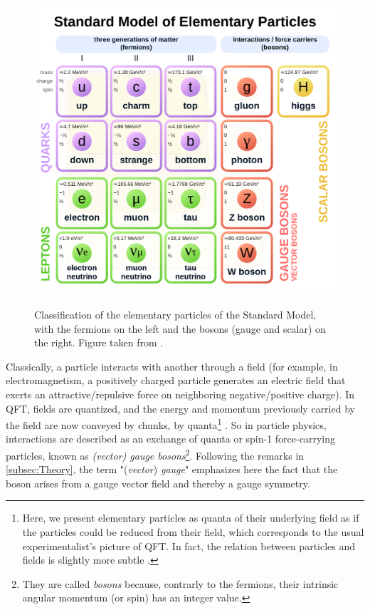 \begin{figure}[h]
	\centering
	\includegraphics[width=\textwidth]{Figs/Chapter2/Standard_Model_of_Elementary_Particles.svg.png}\label{fig:StdModel}
	\caption{Classification of the elementary particles of the Standard Model, with the fermions on the left and the bosons (gauge and scalar) on the right. Figure taken from \cite{missmjStandardModelElementary2019}.}
	\label{fig:StdModel}
\end{figure}

Classically, a particle interacts with another through a field (for example, in electromagnetism, a positively charged particle generates an electric field that exerts an attractive/repulsive force on neighboring negative/positive charge). In QFT, fields are quantized, and the energy and momentum previously carried by the field are now conveyed by chunks, by quanta\footnote{Here, we present elementary particles as quanta  of their underlying field as if the particles could be reduced from their field, which corresponds to the usual experimentalist's picture of QFT. In fact, the relation between particles and fields is slightly more subtle \cite{jaegerElementaryParticlesQuantum2021}.} \cite{serwayModernPhysics2004}. So in particle physics, interactions are described as an exchange of quanta or spin-1 force-carrying particles, known as \textit{(vector) gauge bosons}\footnote{They are called \textit{bosons} because, contrarly to the fermions, their intrinsic angular momentum (or spin) has an integer value.}\cite{braibantParticlesFundamentalInteractions2012}\cite{thomsonModernParticlePhysics2013}. Following the remarks in \Sec\ref{subsec:Theory}, the term "(\textit{vector}) \textit{gauge}" emphasizes here the fact that the boson arises from a gauge vector field and thereby a gauge symmetry. 

